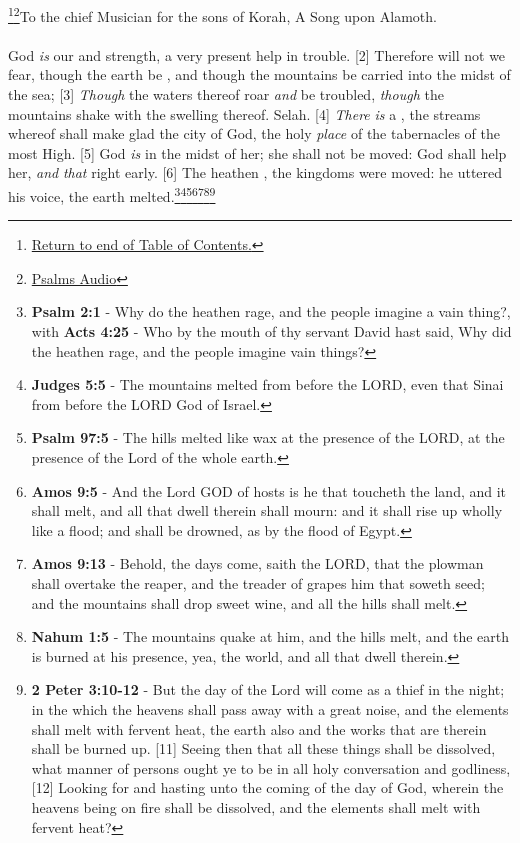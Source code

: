 \footnote{\textcolor[cmyk]{0.99998,1,0,0}{\hyperlink{TOC}{Return to end of Table of Contents.}}}\footnote{\href{https://audiobible.com/bible/psalms_46.html}{\textcolor[cmyk]{0.99998,1,0,0}{Psalms Audio}}}\textcolor[cmyk]{0.99998,1,0,0}{To the chief Musician for the sons of Korah, A Song upon Alamoth.}\\
\\
\textcolor[cmyk]{0.99998,1,0,0}{God \emph{is} our  and strength, a very present help in trouble.}
[2] \textcolor[cmyk]{0.99998,1,0,0}{Therefore will not we fear, though the earth be , and though the mountains be carried into the midst of the sea;}
[3] \textcolor[cmyk]{0.99998,1,0,0}{\emph{Though} the waters thereof roar \emph{and} be troubled, \emph{though} the mountains shake with the swelling thereof. Selah.}
[4] \textcolor[cmyk]{0.99998,1,0,0}{\emph{There} \emph{is} a , the streams whereof shall make glad the city of God, the holy \emph{place} of the tabernacles of the most High.}
[5] \textcolor[cmyk]{0.99998,1,0,0}{God \emph{is} in the midst of her; she shall not be moved: God shall help her, \emph{and} \emph{that} right early.}
[6] \textcolor[cmyk]{0.99998,1,0,0}{The heathen , the kingdoms were moved: he uttered his voice, the earth melted.}\footnote{\textbf{Psalm 2:1} - Why do the heathen rage, and the people imagine a vain thing?, with \textbf{Acts 4:25} - Who by the mouth of thy servant David hast said, Why did the heathen rage, and the people imagine vain things?}\footnote{\textbf{Judges 5:5} - The mountains melted from before the LORD, even that Sinai from before the LORD God of Israel.}\footnote{\textbf{Psalm 97:5} - The hills melted like wax at the presence of the LORD, at the presence of the Lord of the whole earth.}\footnote{\textbf{Amos 9:5} - And the Lord GOD of hosts is he that toucheth the land, and it shall melt, and all that dwell therein shall mourn: and it shall rise up wholly like a flood; and shall be drowned, as by the flood of Egypt.}\footnote{\textbf{Amos 9:13} - Behold, the days come, saith the LORD, that the plowman shall overtake the reaper, and the treader of grapes him that soweth seed; and the mountains shall drop sweet wine, and all the hills shall melt.}\footnote{\textbf{Nahum 1:5} - The mountains quake at him, and the hills melt, and the earth is burned at his presence, yea, the world, and all that dwell therein.}\footnote{\textbf{2 Peter 3:10-12} - But the day of the Lord will come as a thief in the night; in the which the heavens shall pass away with a great noise, and the elements shall melt with fervent heat, the earth also and the works that are therein shall be burned up. [11] Seeing then that all these things shall be dissolved, what manner of persons ought ye to be in all holy conversation and godliness, [12] Looking for and hasting unto the coming of the day of God, wherein the heavens being on fire shall be dissolved, and the elements shall melt with fervent heat?}

